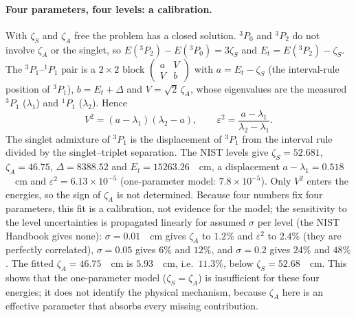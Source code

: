 \paragraph{Four parameters, four levels: a calibration.} With $\zeta_S$ and $\zeta_A$ free the problem has a closed solution. $^3P_0$ and $^3P_2$ do not involve $\zeta_A$ or the singlet, so $E(^3P_2)-E(^3P_0)=3\zeta_S$ and $E_t=E(^3P_2)-\zeta_S$. The $^3P_1$--$^1P_1$ pair is a $2\times2$ block $\begin{pmatrix}a&V\\V&b\end{pmatrix}$ with $a=E_t-\zeta_S$ (the interval-rule position of $^3P_1$), $b=E_t+\Delta$ and $V=\sqrt2\,\zeta_A$, whose eigenvalues are the measured $^3P_1$ ($\lambda_1$) and $^1P_1$ ($\lambda_2$). Hence
\begin{equation}
V^2=(a-\lambda_1)(\lambda_2-a),\qquad \varepsilon^2=\frac{a-\lambda_1}{\lambda_2-\lambda_1}.
\end{equation}
The singlet admixture of $^3P_1$ is the displacement of $^3P_1$ from the interval rule divided by the singlet--triplet separation. The NIST levels give $\zeta_S=52.681$, $\zeta_A=46.75$, $\Delta=8388.52$ and $E_t=15263.26$~\si{\per\centi\metre}, a displacement $a-\lambda_1=0.518$~\si{\per\centi\metre} and $\varepsilon^2=6.13\times10^{-5}$ (one-parameter model: $7.8\times10^{-5}$). Only $V^2$ enters the energies, so the sign of $\zeta_A$ is not determined. Because four numbers fix four parameters, this fit is a calibration, not evidence for the model; the sensitivity to the level uncertainties is propagated linearly for assumed $\sigma$ per level (the NIST Handbook gives none): $\sigma=0.01$~\si{\per\centi\metre} gives $\zeta_A$ to $1.2\%$ and $\varepsilon^2$ to $2.4\%$ (they are perfectly correlated), $\sigma=0.05$ gives $6\%$ and $12\%$, and $\sigma=0.2$ gives $24\%$ and $48\%$. The fitted $\zeta_A=46.75$~\si{\per\centi\metre} is $5.93$~\si{\per\centi\metre}, i.e.\ $11.3\%$, below $\zeta_S=52.68$~\si{\per\centi\metre}. This shows that the one-parameter model ($\zeta_S=\zeta_A$) is insufficient for these four energies; it does not identify the physical mechanism, because $\zeta_A$ here is an effective parameter that absorbs every missing contribution.


